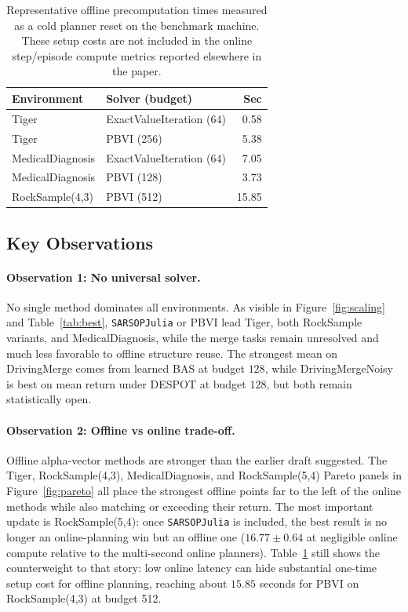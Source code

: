 \documentclass[10pt,twocolumn]{article}
\begin{document}
\begin{table}[t]
\centering
\caption{Representative offline precomputation times measured as a cold planner reset on the benchmark machine. These setup costs are not included in the online step/episode compute metrics reported elsewhere in the paper.}
\label{tab:offlinecost}
\scriptsize
\begin{tabular}{@{}p{} p{} r@{}}
\toprule
Environment & Solver (budget) & Sec \\
\midrule
Tiger & ExactValueIteration (64) & 0.58 \\
Tiger & PBVI (256) & 5.38 \\
MedicalDiagnosis & ExactValueIteration (64) & 7.05 \\
MedicalDiagnosis & PBVI (128) & 3.73 \\
RockSample(4,3) & PBVI (512) & 15.85 \\
\bottomrule
\end{tabular}
\end{table}

\subsection{Key Observations}
\paragraph{Observation 1: No universal solver.}
No single method dominates all environments. As visible in Figure~\ref{fig:scaling} and Table~\ref{tab:best}, \texttt{SARSOPJulia} or PBVI lead Tiger, both RockSample variants, and MedicalDiagnosis, while the merge tasks remain unresolved and much less favorable to offline structure reuse. The strongest mean on DrivingMerge comes from learned BAS at budget $128$, while DrivingMergeNoisy is best on mean return under DESPOT at budget $128$, but both remain statistically open.

\paragraph{Observation 2: Offline vs online trade-off.}
Offline alpha-vector methods are stronger than the earlier draft suggested. The Tiger, RockSample(4,3), MedicalDiagnosis, and RockSample(5,4) Pareto panels in Figure~\ref{fig:pareto} all place the strongest offline points far to the left of the online methods while also matching or exceeding their return. The most important update is RockSample(5,4): once \texttt{SARSOPJulia} is included, the best result is no longer an online-planning win but an offline one ($16.77\pm0.64$ at negligible online compute relative to the multi-second online planners). Table~\ref{tab:offlinecost} still shows the counterweight to that story: low online latency can hide substantial one-time setup cost for offline planning, reaching about $15.85$ seconds for PBVI on RockSample(4,3) at budget 512.
\end{document}
